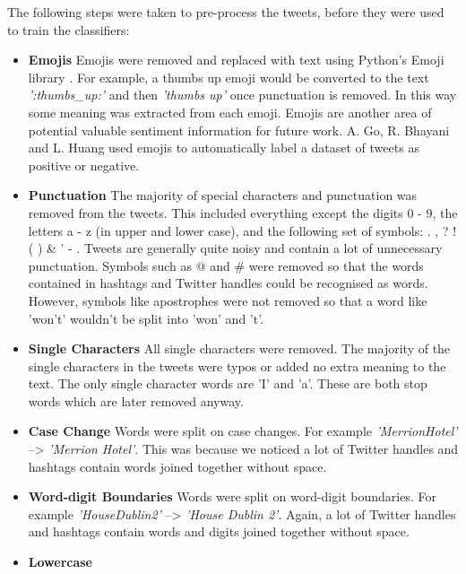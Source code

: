 The following steps were taken to pre-process the tweets, before they were used to train the classifiers:\newline
\begin{itemize}
    \item \textbf{Emojis}\newline
    Emojis were removed and replaced with text using Python's Emoji library \cite{emoji}. For example, a thumbs up emoji would be converted to the text \emph{':thumbs\_up:'} and then \emph{'thumbs up'} once punctuation is removed. In this way some meaning was extracted from each emoji. Emojis are another area of potential valuable sentiment information for future work. A. Go, R. Bhayani and L. Huang \cite{Go2009} used emojis to automatically label a dataset of tweets as positive or negative.
    \item \textbf{Punctuation}\newline
    The majority of special characters and punctuation was removed from the tweets. This included everything except the digits 0 - 9, the letters a - z (in upper and lower case), and the following set of symbols: . , ? ! ( ) \& ' - . Tweets are generally quite noisy and contain a lot of unnecessary punctuation. Symbols such as @ and \# were removed so that the words contained in hashtags and Twitter handles could be recognised as words. However, symbols like apostrophes were not removed so that a word like 'won't' wouldn't be split into 'won' and 't'.
    \item \textbf{Single Characters}\newline
    All single characters were removed. The majority of the single characters in the tweets were typos or added no extra meaning to the text. The only single character words are 'I' and 'a'. These are both stop words which are later removed anyway.
    \item \textbf{Case Change}\newline
    Words were split on case changes. For example \emph{'MerrionHotel'} --> \emph{'Merrion Hotel'}. This was because we noticed a lot of Twitter handles and hashtags contain words joined together without space. 
    \item \textbf{Word-digit Boundaries}\newline
    Words were split on word-digit boundaries. For example \emph{'HouseDublin2'} --> \emph{'House Dublin 2'}. Again, a lot of Twitter handles and hashtags contain words and digits joined together without space. 
    \item \textbf{Lowercase}\newline

\end{itemize}

